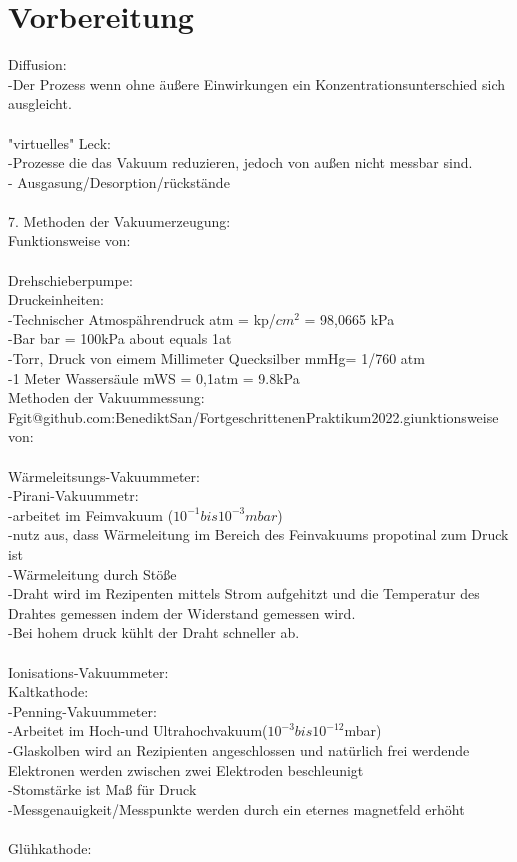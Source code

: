 \section{Vorbereitung}      
	   Diffusion:\\
		-Der Prozess wenn ohne äußere Einwirkungen ein Konzentrationsunterschied sich ausgleicht.\\
		\\
	   "virtuelles" Leck:\\
	   	-Prozesse die das Vakuum reduzieren, jedoch von außen nicht messbar sind.\\
		- Ausgasung/Desorption/rückstände\\
\\
	7. Methoden der Vakuumerzeugung:\\
		Funktionsweise von:\\
\\
		Drehschieberpumpe:\\
	   Druckeinheiten:\\
	   	-Technischer Atmospährendruck atm = kp/$cm^2$ = 98,0665 kPa \\
		-Bar bar = 100kPa about equals 1at\\
		-Torr, Druck von eimem Millimeter Quecksilber mmHg= 1/760 atm\\
		-1 Meter Wassersäule mWS = 0,1atm = 9.8kPa\\
	   Methoden der Vakuummessung:\\
	   	Fgit@github.com:BenediktSan/FortgeschrittenenPraktikum2022.giunktionsweise von:\\
\\
		Wärmeleitsungs-Vakuummeter:\\
			-Pirani-Vakuummetr:\\
				-arbeitet im Feimvakuum ($10^{-1} bis 10^{-3}mbar$)\\
				-nutz aus, dass Wärmeleitung im Bereich des Feinvakuums propotinal zum Druck ist\\
				-Wärmeleitung durch Stöße\\
				-Draht wird im Rezipenten mittels Strom aufgehitzt und die Temperatur des Drahtes gemessen indem der Widerstand gemessen wird.\\
				-Bei hohem druck kühlt der Draht schneller ab.\\
				\\
		Ionisations-Vakuummeter:\\
			Kaltkathode:\\
				-Penning-Vakuummeter:\\
					-Arbeitet im Hoch-und Ultrahochvakuum($10^{-3} bis 10^{-12}$mbar)\\
					-Glaskolben wird an Rezipienten angeschlossen und natürlich frei werdende Elektronen werden zwischen zwei Elektroden beschleunigt\\
					-Stomstärke ist Maß für Druck\\
					-Messgenauigkeit/Messpunkte werden durch ein eternes magnetfeld erhöht\\
					\\
			Glühkathode:\\
